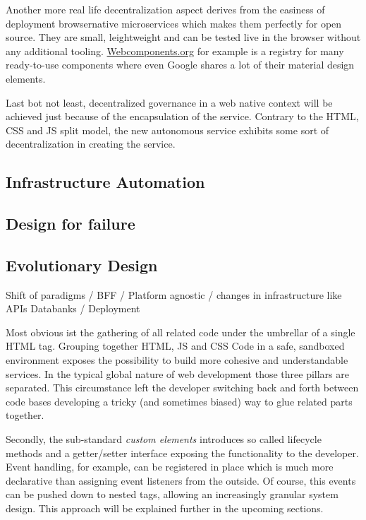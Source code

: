 \documentclass[]{assets/latex/ieee}
\begin{document}
Another more real life decentralization aspect derives from the easiness
of deployment browsernative microservices which makes them perfectly for
open source. They are small, leightweight and can be tested live in the
browser without any additional tooling.
\href{https://webcomponents.org}{Webcomponents.org} for example is a
registry for many ready-to-use components where even Google shares a lot
of their material design elements.

Last bot not least, decentralized governance in a web native context
will be achieved just because of the encapsulation of the service.
Contrary to the HTML, CSS and JS split model, the new autonomous service
exhibits some sort of decentralization in creating the service.

\subsection{Infrastructure Automation}\label{infrastructure-automation}

\subsection{Design for failure}\label{design-for-failure}

\subsection{Evolutionary Design}\label{evolutionary-design}

Shift of paradigms / BFF / Platform agnostic / changes in infrastructure
like APIs Databanks / Deployment

Most obvious ist the gathering of all related code under the umbrellar
of a single HTML tag. Grouping together HTML, JS and CSS Code in a safe,
sandboxed environment exposes the possibility to build more cohesive and
understandable services. In the typical global nature of web development
those three pillars are separated. This circumstance left the developer
switching back and forth between code bases developing a tricky (and
sometimes biased) way to glue related parts together.

Secondly, the sub-standard \emph{custom elements} introduces so called
lifecycle methods and a getter/setter interface exposing the
functionality to the developer. Event handling, for example, can be
registered in place which is much more declarative than assigning event
listeners from the outside. Of course, this events can be pushed down to
nested tags, allowing an increasingly granular system design. This
approach will be explained further in the upcoming sections.
\end{document}
